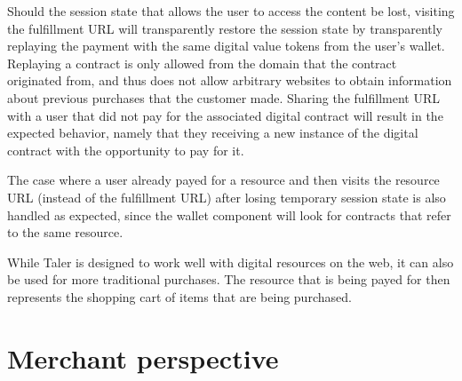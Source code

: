 \documentclass[twoside,letterpaper]{sigalternate}
\begin{document}

Should the session state that allows the user to access the content be lost,
visiting the fulfillment URL will transparently restore the session state by
transparently replaying the payment with the same digital value tokens from the
user's wallet.  Replaying a contract is only allowed from the domain that the
contract originated from, and thus does not allow arbitrary websites to obtain
information about previous purchases that the customer made.  Sharing the
fulfillment URL with a user that did not pay for the associated digital
contract will result in the expected behavior, namely that they receiving a new
instance of the digital contract with the opportunity to pay for it.


The case where a user already payed for a resource and then visits
the resource URL (instead of the fulfillment URL) after losing temporary
session state is also handled as expected, since the wallet component will
look for contracts that refer to the same resource.

While Taler is designed to work well with digital resources on the web,
it can also be used for more traditional purchases.  The resource that
is being payed for then represents the shopping cart of items that
are being purchased.

\section{Merchant perspective}



\end{document}
